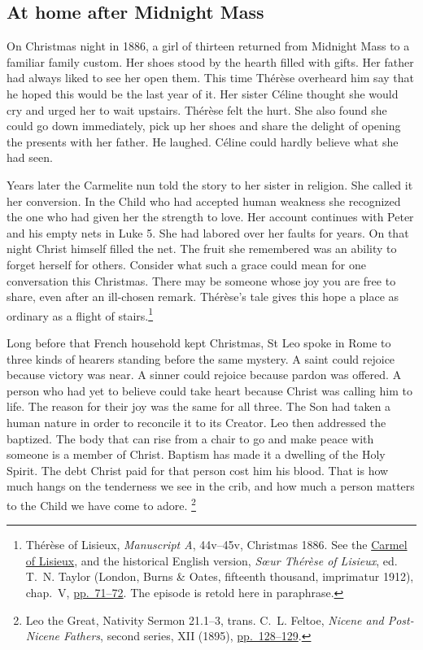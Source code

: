 \subsection{At home after Midnight Mass}

On Christmas night in 1886, a girl of thirteen returned from Midnight Mass
to a familiar family custom. Her shoes stood by the hearth filled with
gifts. Her father had always liked to see her open them. This time Thérèse
overheard him say that he hoped this would be the last year of it. Her
sister Céline thought she would cry and urged her to wait upstairs. Thérèse
felt the hurt. She also found she could go down immediately, pick up her
shoes and share the delight of opening the presents with her father. He
laughed. Céline could hardly believe what she had seen.

Years later the Carmelite nun told the story to her sister in religion.
She called it her conversion. In the Child who had accepted human weakness
she recognized the one who had given her the strength to love. Her account
continues with Peter and his empty nets in Luke 5. She had labored over
her faults for years. On that night Christ himself filled the net. The
fruit she remembered was an ability to forget herself for others. Consider
what such a grace could mean for one conversation this Christmas. There
may be someone whose joy you are free to share, even after an ill-chosen
remark. Thérèse's tale gives this hope a place as ordinary as a flight of
stairs.\footnote{Thérèse of Lisieux, \emph{Manuscript A}, 44v--45v,
Christmas 1886. See the \href{https://archives.carmeldelisieux.fr/naissance-dune-sainte/iconographie-theresienne/la-vie-en-images/du-sourire-de-la-vierge-a-lentree-au-carmel/}{Carmel of Lisieux},
and the historical English version, \emph{Sœur Thérèse of Lisieux}, ed.
T.~N. Taylor (London, Burns \& Oates, fifteenth thousand, imprimatur
1912), chap.~V, \href{https://archive.org/details/saintthaeraeseof00thaeuoft/page/71/mode/2up}{pp.~71--72}.
The episode is retold here in paraphrase.}

Long before that French household kept Christmas, St Leo spoke in Rome
to three kinds of hearers standing before the same mystery. A saint could
rejoice because victory was near. A sinner could rejoice because pardon
was offered. A person who had yet to believe could take heart because
Christ was calling him to life. The reason for their joy was the same for
all three. The Son had taken a human nature in order to reconcile it to its
Creator. Leo then addressed the baptized. The body that can rise from a chair
to go and make peace with someone is a member of Christ. Baptism has made
it a dwelling of the Holy Spirit. The debt Christ paid for that person
cost him his blood. That is how much hangs on the tenderness we see in the
crib, and how much a person matters to the Child we have come to adore.
\footnote{Leo the Great, Nativity Sermon 21.1--3, trans. C.~L. Feltoe,
\emph{Nicene and Post-Nicene Fathers}, second series, XII (1895),
\href{https://www.ccel.org/ccel/schaff/npnf212.html}{pp.~128--129}.}

